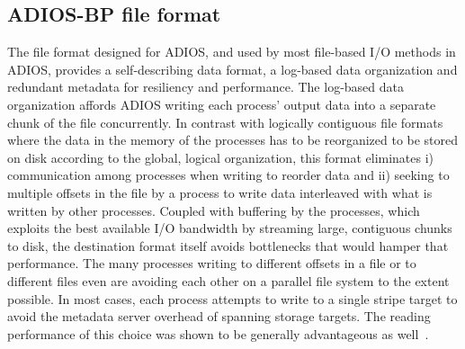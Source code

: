 \subsection{ADIOS-BP file format}
The file format designed for ADIOS, and used by most file-based I/O methods in ADIOS, provides a self-describing data format, a log-based data organization and redundant metadata for resiliency and performance. The log-based data organization affords ADIOS writing each process' output data into a separate chunk of the file concurrently. In contrast with logically contiguous file formats where the data in the memory of the processes has to be reorganized to be stored on disk according to the global, logical organization, this format eliminates i) communication among processes when writing to reorder data and ii) seeking to multiple offsets in the file by a process to write data interleaved with what is written by other processes. Coupled with buffering by the processes, which exploits the best available I/O bandwidth by streaming large, contiguous chunks to disk, the destination format itself avoids bottlenecks that would hamper that performance. The many processes writing to different offsets in a file or to different files even are avoiding each other on a parallel file system to the extent possible. In most cases, each process attempts to write to a single stripe target to avoid the metadata server overhead of spanning storage targets.  The reading performance of this choice was shown to be generally advantageous as well~\cite{ADIOS:Lofstead:hpdc11}.

